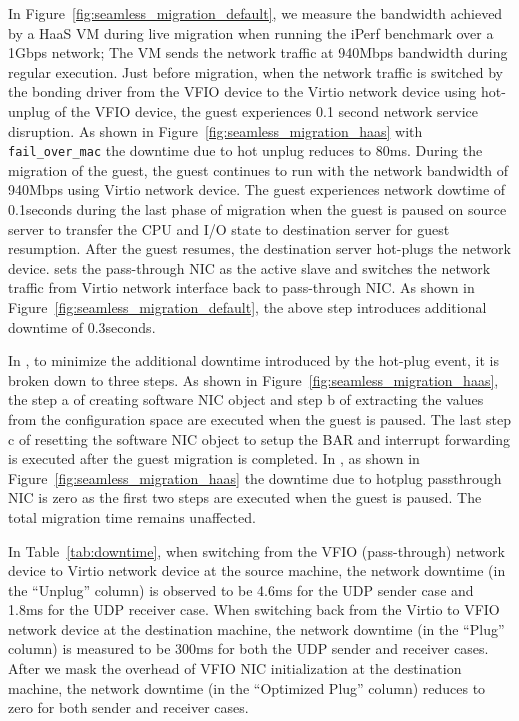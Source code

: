 In Figure~\ref{fig:seamless_migration_default}, we measure 
the bandwidth achieved by a HaaS VM during live migration
when running the iPerf benchmark over a 1Gbps network;
The VM sends the network traffic at 940Mbps bandwidth 
during regular execution. Just before migration, when the network traffic is 
switched by the bonding driver from the VFIO device to 
the Virtio network device using  hot-unplug of the VFIO device, 
the guest experiences 0.1 second network service disruption.
As shown in Figure~\ref{fig:seamless_migration_haas} with
\texttt{fail\_over\_mac} the downtime due to hot unplug reduces 
to 80ms.
During the migration of the guest, the guest continues
to run with the network bandwidth of 940Mbps using Virtio network
device. The guest experiences network dowtime of 
0.1seconds during the last phase of migration 
when the guest is paused on source server
to transfer the CPU and I/O state to destination server 
for guest resumption. After the guest resumes, the
destination server hot-plugs the network device. \na
sets the pass-through NIC as the active slave and
switches the network traffic from Virtio network interface
back to pass-through NIC. As shown in 
Figure~\ref{fig:seamless_migration_default}, the above step
introduces additional downtime of 0.3seconds.

In \na, to minimize the additional downtime introduced by
the hot-plug event, it is broken down to three steps.
As shown in Figure~\ref{fig:seamless_migration_haas}, 
the step a of creating software NIC object 
and step b of extracting the values from the 
configuration space are executed when the guest 
is paused. The last step c of resetting the 
software NIC object to setup the BAR and 
interrupt forwarding is executed after 
the guest migration is completed. In \na, as
shown in Figure~\ref{fig:seamless_migration_haas} the 
downtime due to hotplug passthrough NIC is zero
as the first two steps are executed when the guest is
paused. The total migration time remains unaffected.

In Table~\ref{tab:downtime}, when switching
from the VFIO (pass-through) network device to Virtio network device
at the source machine, the network downtime (in the ``Unplug'' column)
is observed to be 4.6ms for the UDP sender case and 1.8ms for the  UDP receiver case. 
When switching back from the Virtio to  VFIO network device at the destination
machine, the network downtime (in the ``Plug'' column)
is measured to be 300ms for both the UDP sender and receiver cases. 
After we mask the overhead of VFIO NIC
initialization at the destination machine,
the network downtime (in the ``Optimized Plug'' column) reduces to zero for both sender and receiver cases.

